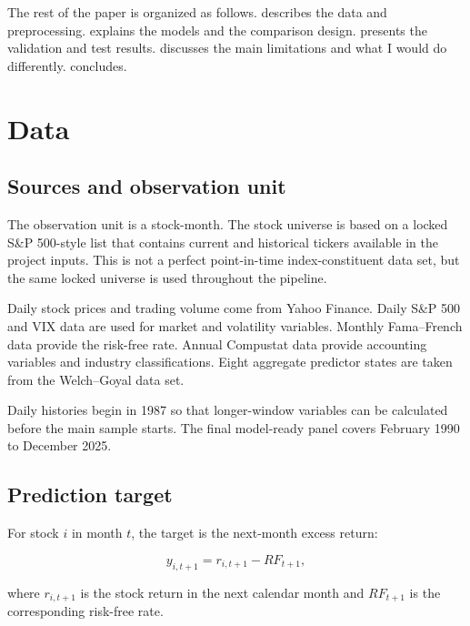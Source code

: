 \documentclass[11pt,a4paper]{article}
\begin{document}
The rest of the paper is organized as follows.  describes the
data and preprocessing.  explains the models and the
comparison design.  presents the validation and test results.
 discusses the main limitations and what I would
do differently.  concludes.

\section{Data}
\label{sec:data}

\subsection{Sources and observation unit}

The observation unit is a stock-month. The stock universe is based on a locked
S\&P 500-style list that contains current and historical tickers available in
the project inputs. This is not a perfect point-in-time index-constituent data
set, but the same locked universe is used throughout the pipeline.

Daily stock prices and trading volume come from Yahoo Finance. Daily S\&P 500
and VIX data are used for market and volatility variables. Monthly
Fama--French data provide the risk-free rate. Annual Compustat data provide
accounting variables and industry classifications. Eight aggregate predictor
states are taken from the Welch--Goyal data set.

Daily histories begin in 1987 so that longer-window variables can be calculated
before the main sample starts. The final model-ready panel covers February 1990
to December 2025.

\subsection{Prediction target}

For stock \(i\) in month \(t\), the target is the next-month excess return:

\begin{equation}
 y_{i,t+1}=r_{i,t+1}-RF_{t+1},
 \label{eq:target}
\end{equation}

where \(r_{i,t+1}\) is the stock return in the next calendar month and
\(RF_{t+1}\) is the corresponding risk-free rate.
\end{document}
